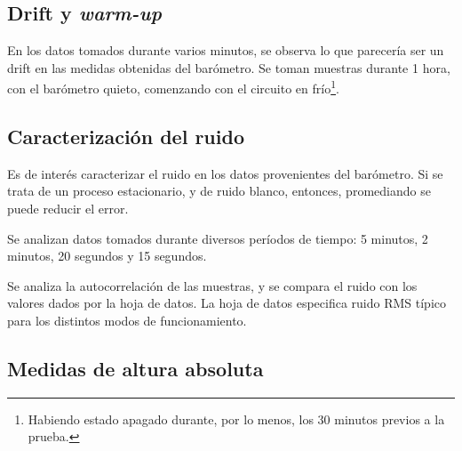 \documentclass[main]{subfiles}
\begin{document}
\subsection{Drift y \textit{warm-up}}
\label{sec:drift-y-warm-up}

En los datos tomados durante varios minutos, se observa lo que parecería ser un drift en las medidas obtenidas del barómetro. Se toman muestras durante 1 hora, con el barómetro quieto, comenzando con el circuito en frío\footnote{Habiendo estado apagado durante, por lo menos, los 30 minutos previos a la prueba.}.

\subsection{Caracterización del ruido}

Es de interés caracterizar el ruido en los datos provenientes del barómetro. Si se trata de un proceso estacionario, y de ruido blanco, entonces, promediando se puede reducir el error.

Se analizan datos tomados durante diversos períodos de tiempo: 5 minutos, 2 minutos, 20 segundos y 15 segundos.

Se analiza la autocorrelación de las muestras, y se compara el ruido con los valores dados por la hoja de datos. La hoja de datos especifica ruido RMS típico para los distintos modos de funcionamiento.

\subsection{Medidas de altura absoluta}
\end{document}

